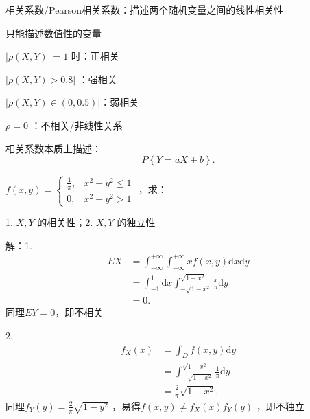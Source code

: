 \begin{notation}
    相关系数/Pearson相关系数：描述两个随机变量之间的线性相关性

    只能描述数值性的变量
\end{notation}
$|\rho\left( X,Y \right)|=1 $ 时：正相关

$\left| \rho\left( X,Y \right) >0.8 \right| $ ：强相关

$\left| \rho\left( X,Y \right) \in \left( 0,0.5 \right)  \right| $：弱相关

$\rho=0$ ：不相关/非线性关系
\begin{notation}
    相关系数本质上描述：
    \[
        P\left\{ Y=aX+b \right\} 
    .\] 
\end{notation}
\begin{eg}
    $f\left( x,y \right) =\begin{cases}
        \frac{1}{\pi} ,&x^2+y^2\le 1\\
        0,&x^2+y^2>1
    \end{cases}$ ，求：

    1. $X,Y$ 的相关性；2. $X,Y$ 的独立性
\end{eg}
解：1. 
\begin{align*}
    EX&=\int_{-\infty}^{+\infty} \int_{-\infty}^{+\infty} xf\left( x,y \right)  \mathrm{d}x \mathrm{d}y\\
    &= \int_{-1}^{1}  \mathrm{d}x \int_{-\sqrt{1-x^2} }^{\sqrt{1-x^2} } \frac{x}{\pi}  \mathrm{d}y \\
    &= 0
.\end{align*}
同理$EY=0$，即不相关

2. 
\begin{align*}
    f_X\left( x \right) &= \int_{D}^{} f\left( x,y \right)  \mathrm{d}y \\
    &=\int_{-\sqrt{1-x^2} }^{\sqrt{1-x^2} } \frac{1}{\pi}  \mathrm{d}y\\
                        &=\frac{2}{\pi} \sqrt{1-x^2} 
.\end{align*}
同理$f_Y\left( y \right) ={\frac{2}{\pi} \sqrt{1-y^2}}$ ，易得$f\left( x,y \right) \neq f_X\left( x \right) f_Y\left( y \right) $ ，即不独立
{}

